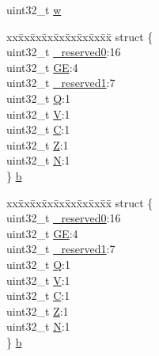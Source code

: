 \begin{DoxyCompactItemize}
\begin{tabbing}
\end{tabbing}\item 
uint32\+\_\+t \mbox{\hyperlink{union_a_p_s_r___type_ad0fb62e7a08e70fc5e0a76b67809f84b}{w}}
\item 
\begin{tabbing}
xx\=xx\=xx\=xx\=xx\=xx\=xx\=xx\=xx\=\kill
struct \{\\
\>uint32\_t \mbox{\hyperlink{union_a_p_s_r___type_ac8a6a13838a897c8d0b8bc991bbaf7c1}{\_reserved0}}:16\\
\>uint32\_t \mbox{\hyperlink{union_a_p_s_r___type_aa91800ec6e90e457c7a1acd1f2e17099}{GE}}:4\\
\>uint32\_t \mbox{\hyperlink{union_a_p_s_r___type_a959a73d8faee56599b7e792a7c5a2d16}{\_reserved1}}:7\\
\>uint32\_t \mbox{\hyperlink{union_a_p_s_r___type_a65f27ddc4f7e09c14ce7c5211b2e000a}{Q}}:1\\
\>uint32\_t \mbox{\hyperlink{union_a_p_s_r___type_acd4a2b64faee91e4a9eef300667fa222}{V}}:1\\
\>uint32\_t \mbox{\hyperlink{union_a_p_s_r___type_a7a1caf92f32fe9ebd8d1fe89b06c7776}{C}}:1\\
\>uint32\_t \mbox{\hyperlink{union_a_p_s_r___type_a5ae954cbd9986cd64625d7fa00943c8e}{Z}}:1\\
\>uint32\_t \mbox{\hyperlink{union_a_p_s_r___type_abae0610bc2a97bbf7f689e953e0b451f}{N}}:1\\
\} \mbox{\hyperlink{union_a_p_s_r___type_a593dce2636921777ec2a4875fe032b68}{b}}\\

\end{tabbing}\item 
\begin{tabbing}
xx\=xx\=xx\=xx\=xx\=xx\=xx\=xx\=xx\=\kill
struct \{\\
\>uint32\_t \mbox{\hyperlink{union_a_p_s_r___type_ac8a6a13838a897c8d0b8bc991bbaf7c1}{\_reserved0}}:16\\
\>uint32\_t \mbox{\hyperlink{union_a_p_s_r___type_aa91800ec6e90e457c7a1acd1f2e17099}{GE}}:4\\
\>uint32\_t \mbox{\hyperlink{union_a_p_s_r___type_a959a73d8faee56599b7e792a7c5a2d16}{\_reserved1}}:7\\
\>uint32\_t \mbox{\hyperlink{union_a_p_s_r___type_a65f27ddc4f7e09c14ce7c5211b2e000a}{Q}}:1\\
\>uint32\_t \mbox{\hyperlink{union_a_p_s_r___type_acd4a2b64faee91e4a9eef300667fa222}{V}}:1\\
\>uint32\_t \mbox{\hyperlink{union_a_p_s_r___type_a7a1caf92f32fe9ebd8d1fe89b06c7776}{C}}:1\\
\>uint32\_t \mbox{\hyperlink{union_a_p_s_r___type_a5ae954cbd9986cd64625d7fa00943c8e}{Z}}:1\\
\>uint32\_t \mbox{\hyperlink{union_a_p_s_r___type_abae0610bc2a97bbf7f689e953e0b451f}{N}}:1\\
\} \mbox{\hyperlink{union_a_p_s_r___type_a4ec850ae1a2959785d92187338a71190}{b}}\\

\end{tabbing}\end{DoxyCompactItemize}


